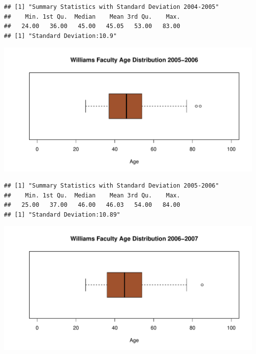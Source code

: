 \documentclass[12pt,a4paper]{article}\usepackage[]{graphicx}\usepackage[]{color}
\makeatletter
\def\maxwidth{ %
  \ifdim\Gin@nat@width>\linewidth
    \linewidth
  \else
    \Gin@nat@width
  \fi
}
\newenvironment{kframe}{%
 \def\at@end@of@kframe{}%
 \ifinner\ifhmode%
  \def\at@end@of@kframe{\end{minipage}}%
  \begin{minipage}{\columnwidth}%
 \fi\fi%
 \def\FrameCommand##1{\hskip\@totalleftmargin \hskip-\fboxsep
 \colorbox{shadecolor}{##1}\hskip-\fboxsep
     \hskip-\linewidth \hskip-\@totalleftmargin \hskip\columnwidth}%
 \MakeFramed {\advance\hsize-\width
   \@totalleftmargin\z@ \linewidth\hsize
   \@setminipage}}%
 {\par\unskip\endMakeFramed%
 \at@end@of@kframe}
\newenvironment{knitrout}{}{} %
\theoremstyle{definition}
\makeatother
\begin{document}
\begin{knitrout}
\color{fgcolor}\begin{kframe}
\begin{verbatim}
## [1] "Summary Statistics with Standard Deviation 2004-2005"
##    Min. 1st Qu.  Median    Mean 3rd Qu.    Max. 
##   24.00   36.00   45.00   45.05   53.00   83.00
## [1] "Standard Deviation:10.9"
\end{verbatim}
\end{kframe}
\end{knitrout}

\begin{knitrout}
\color{fgcolor}
\includegraphics[width=\maxwidth]{figure/unnamed-chunk-15-1} 

\end{knitrout}

\begin{knitrout}
\color{fgcolor}\begin{kframe}
\begin{verbatim}
## [1] "Summary Statistics with Standard Deviation 2005-2006"
##    Min. 1st Qu.  Median    Mean 3rd Qu.    Max. 
##   25.00   37.00   46.00   46.03   54.00   84.00
## [1] "Standard Deviation:10.89"
\end{verbatim}
\end{kframe}
\end{knitrout}


\begin{knitrout}
\color{fgcolor}
\includegraphics[width=\maxwidth]{figure/unnamed-chunk-17-1} 

\end{knitrout}
\end{document}
